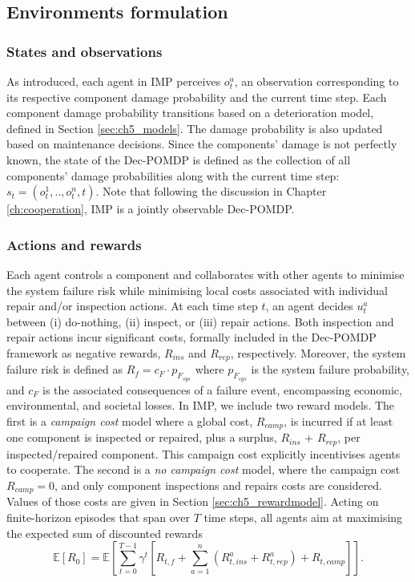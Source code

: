 \subsection{Environments formulation}
\label{sec:env_formulation}

\subsubsection{States and observations}
As introduced, each agent in IMP perceives $o^a_t$, an observation corresponding to its respective component damage probability and the current time step.
Each component damage probability transitions based on a deterioration model, defined in Section \ref{sec:ch5_models}.
The damage probability is also updated based on maintenance decisions.
Since the components' damage is not perfectly known, the state of the Dec-POMDP is defined as the collection of all components' damage probabilities along with the current time step: $s_t = (o_t^1, .., o_t^n, t)$.
Note that following the discussion in Chapter \ref{ch:cooperation}, IMP is a jointly observable Dec-POMDP.

\subsubsection{Actions and rewards}
Each agent controls a component and collaborates with other agents to minimise the system failure risk while minimising local costs associated with individual repair and/or inspection actions. 
At each time step $t$, an agent decides $u^a_t$ between (i) do-nothing, (ii) inspect, or (iii) repair actions.
Both inspection and repair actions incur significant costs, formally included in the Dec-POMDP framework as negative rewards, $R_{ins}$ and $R_{rep}$, respectively.
Moreover, the system failure risk is defined as $R_f= c_F \cdot p_{F_{sys}}$ where $p_{F_{sys}}$ is the system failure probability, and $c_F$ is the associated consequences of a failure event, encompassing economic, environmental, and societal losses.
In IMP, we include two reward models.
The first is a \emph{campaign cost} model where a global cost, $R_{camp}$, is incurred if at least one component is inspected or repaired, plus a surplus, $R_{ins}$ + $R_{rep}$, per inspected/repaired component.
This campaign cost explicitly incentivises agents to cooperate.
The second is a \emph{no campaign cost} model, where the campaign cost $R_{camp}=0$, and only component inspections and repairs costs are considered. 
Values of those costs are given in Section \ref{sec:ch5_rewardmodel}.
Acting on finite-horizon episodes that span over $T$ time steps, all agents aim at maximising the expected sum of discounted rewards
\begin{equation}
\label{eq:ch5_rewardimpmarl}
    \mathbb{E}[R_{0}] = \mathbb{E} \left[ \sum_{t=0}^{T-1} \gamma^t \left[ R_{t,f}+ \sum_{a=1}^n \left({R_{t,ins}^a} + {R_{t,rep}^a}\right)+R_{t,camp} \right] \right].
\end{equation}

